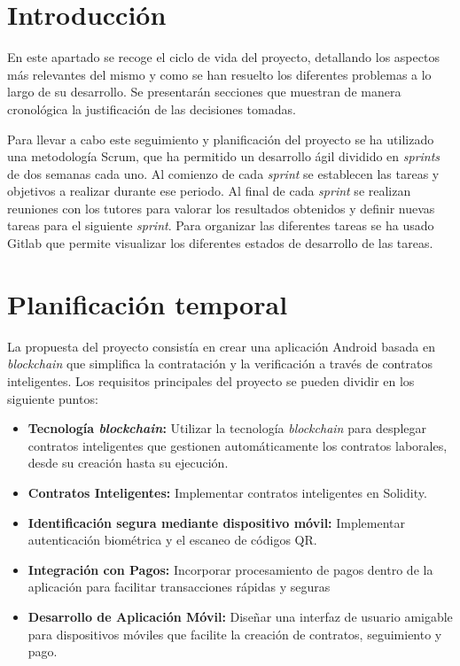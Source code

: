 

\section{Introducción}

En este apartado se recoge el ciclo de vida del proyecto, detallando los aspectos más relevantes del mismo y como se han resuelto los diferentes problemas a lo largo de su desarrollo. Se presentarán secciones que muestran de manera cronológica la justificación de las decisiones tomadas.

Para llevar a cabo este seguimiento y planificación del proyecto se ha utilizado una metodología Scrum, que ha permitido un desarrollo ágil dividido en \textit{sprints} de dos semanas cada uno. 
Al comienzo de cada \textit{sprint} se establecen las tareas y objetivos a realizar durante ese periodo. Al final de cada \textit{sprint} se realizan reuniones con los tutores para valorar los resultados obtenidos y definir nuevas tareas para el siguiente \textit{sprint}.
Para organizar las diferentes tareas se ha usado Gitlab que permite visualizar los diferentes estados de desarrollo de las tareas.


\section{Planificación temporal}

La propuesta del proyecto consistía en crear una aplicación Android basada en \textit{blockchain} que simplifica la contratación y la verificación a través de contratos inteligentes.
Los requisitos principales del proyecto se pueden dividir en los siguiente puntos:

\begin{itemize}

\item \textbf{Tecnología \textit{blockchain}:} Utilizar la tecnología \textit{blockchain} para desplegar contratos inteligentes que gestionen automáticamente los contratos laborales, desde su creación hasta su ejecución.

\item \textbf{Contratos Inteligentes:} Implementar contratos inteligentes en Solidity.


\item \textbf{Identificación segura mediante dispositivo móvil:} Implementar autenticación biométrica y el escaneo de códigos QR.

\item \textbf{Integración con Pagos:} Incorporar procesamiento de pagos dentro de la aplicación para facilitar transacciones rápidas y seguras

\item \textbf{Desarrollo de Aplicación Móvil:} Diseñar una interfaz de usuario amigable para dispositivos móviles que facilite la creación de contratos, seguimiento y pago.

\end{itemize}

